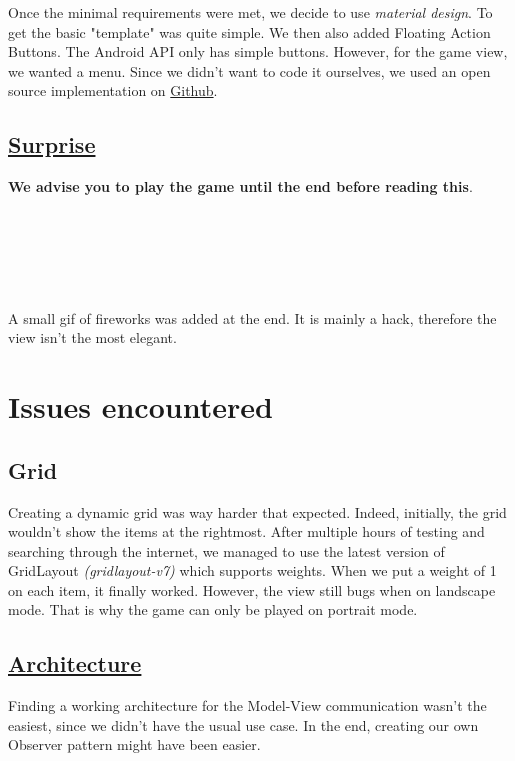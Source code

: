 \documentclass{article}
\begin{document}
Once the minimal requirements were met, we decide to use \textit{material design}. To get the basic "template" was quite simple. We then also added Floating Action Buttons. The Android API only has simple buttons. However, for the game view, we wanted a menu. Since we didn't want to code it ourselves, we used an open source implementation on \href{https://github.com/Clans/FloatingActionButton}{Github}.

\subsection{\href{https://media.giphy.com/media/RmmUkEitovbyM/giphy.gif}{Surprise}}

\textbf{We advise you to play the game until the end before reading this}. 

\ \\ 
\ \\
\ \\
\ \\
\ \\

A small gif of fireworks was added at the end. It is mainly a hack, therefore the view isn't the most elegant. 


\section{Issues encountered}

\subsection{Grid}

Creating a dynamic grid was way harder that expected. Indeed, initially, the grid wouldn't show the items at the rightmost. After multiple hours of testing and searching through the internet, we managed to use the latest version of GridLayout \textit{(gridlayout-v7)} which supports weights. When we put a weight of 1 on each item, it finally worked. However, the view still bugs when on landscape mode. That is why the game can only be played on portrait mode.

\subsection{\href{https://media.tenor.co/images/bdbe70ee818da02b0b7e7e3fd390a9c0/raw}{Architecture}}

Finding a working architecture for the Model-View communication wasn't the easiest, since we didn't have the usual use case. In the end, creating our own Observer pattern might have been easier.
\end{document}
